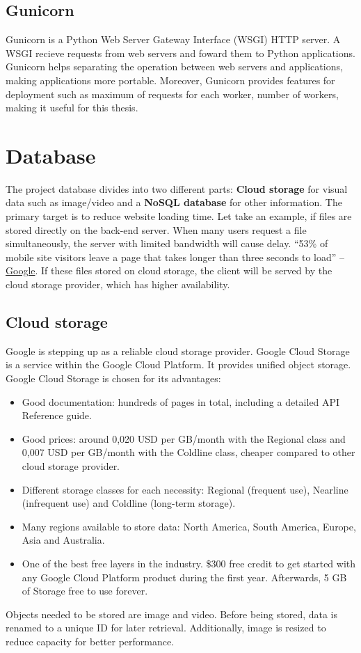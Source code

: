 \subsection{Gunicorn}
Gunicorn is a Python Web Server Gateway Interface (WSGI) HTTP server. A WSGI recieve requests from web servers and foward them to Python applications.
Gunicorn helps separating the operation between web servers and applications, making applications more portable. Moreover, Gunicorn provides features for deployment such as maximum of requests for each worker, number of workers, making it useful for this thesis.

\section{Database}
The project database divides into two different parts: \textbf{Cloud storage} for visual data such as image/video and a \textbf{NoSQL database} for other information. The primary target is to reduce website loading time. Let take an example, if files are stored directly on the back-end server. When many users request a file simultaneously, the server with limited bandwidth will cause delay. “53\% of mobile site visitors leave a page that takes longer than three seconds to load” – \href{https://think.storage.googleapis.com/docs/mobile-page-speed-new-industry-benchmarks.pdf}{Google}. If these files stored on cloud storage, the client will be served by the cloud storage provider, which has higher availability.
\subsection{Cloud storage}
Google is stepping up as a reliable cloud storage provider. Google Cloud Storage is a service within the Google Cloud Platform. It provides unified object storage. 
Google Cloud Storage is chosen for its advantages:
\begin{itemize}
\item Good documentation: hundreds of pages in total, including a detailed API Reference guide.
\item Good prices: around 0,020 USD per GB/month with the Regional class and 0,007 USD per GB/month with the Coldline class, cheaper compared to other cloud storage provider.
\item Different storage classes for each necessity: Regional (frequent use), Nearline (infrequent use) and Coldline (long-term storage).
\item Many regions available to store data: North America, South America, Europe, Asia and Australia.
\item One of the best free layers in the industry. \$300 free credit to get started with any Google Cloud Platform product during the first year. Afterwards, 5 GB of Storage free to use forever.
\end{itemize}
Objects needed to be stored are image and video. Before being stored, data is renamed to a unique ID for later retrieval. Additionally, image is resized to reduce capacity for better performance.
